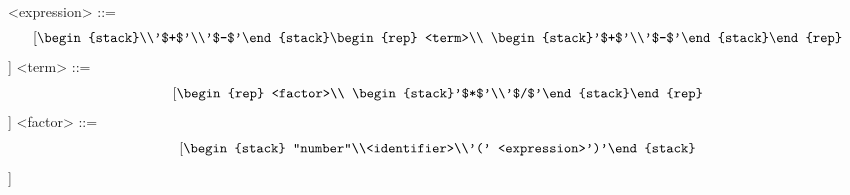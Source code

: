 \documentclass{article}
\begin{document}
\begin{grammar}
<expression> ::= \[[
  \begin{stack}\\'$+$'\\'$-$'\end{stack}\begin{rep} <term>\\ \begin{stack}'$+$'\\'$-$'\end{stack}\end{rep}
\]]
<term> ::= \[[
  \begin{rep} <factor>\\ \begin{stack}'$*$'\\'$/$'\end{stack}\end{rep}
\]]
<factor> ::= \[[
\begin{stack} "number"\\<identifier>\\'(' <expression>')'\end{stack} 
\]]
\end{grammar}
\end{document}
